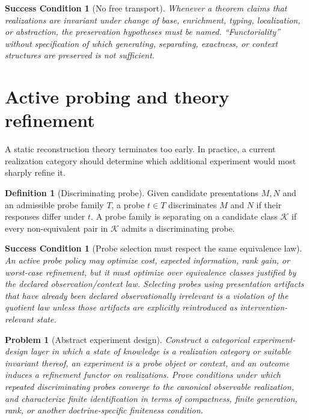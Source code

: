 \documentclass[11pt]{article}
\newtheorem{condition}[theorem]{Success Condition}
\newtheorem{problem}[theorem]{Problem}
\theoremstyle{definition}
\newtheorem{definition}[theorem]{Definition}
\theoremstyle{remark}
\begin{document}
\begin{condition}[No free transport]
Whenever a theorem claims that realizations are invariant under change of base, enrichment, typing, localization, or abstraction, the preservation hypotheses must be named. ``Functoriality'' without specification of which generating, separating, exactness, or context structures are preserved is not sufficient.
\end{condition}

\section{Active probing and theory refinement}

A static reconstruction theory terminates too early. In practice, a current realization category should determine which additional experiment would most sharply refine it.

\begin{definition}[Discriminating probe]
Given candidate presentations $M,N$ and an admissible probe family $T$, a probe $t\in T$ discriminates $M$ and $N$ if their responses differ under $t$. A probe family is separating on a candidate class $\mathcal K$ if every non-equivalent pair in $\mathcal K$ admits a discriminating probe.
\end{definition}

\begin{condition}[Probe selection must respect the same equivalence law]
An active probe policy may optimize cost, expected information, rank gain, or worst-case refinement, but it must optimize over equivalence classes justified by the declared observation/context law. Selecting probes using presentation artifacts that have already been declared observationally irrelevant is a violation of the quotient law unless those artifacts are explicitly reintroduced as intervention-relevant state.
\end{condition}

\begin{problem}[Abstract experiment design]
Construct a categorical experiment-design layer in which a state of knowledge is a realization category or suitable invariant thereof, an experiment is a probe object or context, and an outcome induces a refinement functor on realizations. Prove conditions under which repeated discriminating probes converge to the canonical observable realization, and characterize finite identification in terms of compactness, finite generation, rank, or another doctrine-specific finiteness condition.
\end{problem}
\end{document}
